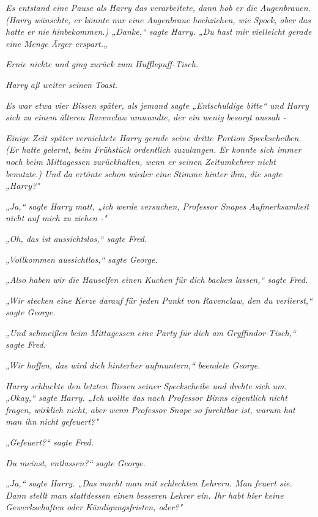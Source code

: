 {\emph{Es entstand eine Pause als Harry das verarbeitete, dann hob er die Augenbrauen. (Harry wünschte, er könnte nur eine Augenbraue hochziehen, wie Spock, aber das hatte er nie hinbekommen.) „Danke,“ sagte Harry. „Du hast mir vielleicht gerade eine Menge Ärger erspart.„}

\emph{Ernie nickte und ging zurück zum Hufflepuff-Tisch.}

\emph{Harry} \emph{aß weiter seinen} \emph{Toast.}

\emph{Es war etwa vier Bissen später, als jemand sagte „Entschuldige bitte“ und Harry sich zu einem älteren Ravenclaw} \emph{umwandte, der ein wenig besorgt aussah -}

\emph{Einige Zeit später vernichtete Harry gerade seine dritte Portion Speckscheiben. (Er hatte gelernt, beim Frühstück ordentlich zuzulangen. Er konnte sich immer noch beim Mittagessen zurückhalten, wenn er seinen Zeitumkehrer nicht benutzte.) Und da ertönte} \emph{schon wieder eine} \emph{Stimme hinter ihm, die sagte „Harry?"}

\emph{„Ja,“ sagte Harry} \emph{matt, „ich werde versuchen, Professor Snapes Aufmerksamkeit nicht auf mich zu ziehen -"}

\emph{„Oh, das ist aussichtslos,“ sagte Fred.}

\emph{„Vollkommen aussichtlos,“ sagte George.}

\emph{„Also haben wir die Hauselfen einen Kuchen für dich backen lassen,“ sagte Fred.}

\emph{„Wir stecken eine Kerze darauf für jeden Punkt} \emph{von} \emph{Ravenclaw, den du verlierst,“ sagte George.}

\emph{„Und schmeißen beim Mittagessen eine Party für dich am Gryffindor-Tisch,“ sagte Fred.}

\emph{„Wir hoffen, das wird dich hinterher aufmuntern,“ beendete George.}

\emph{Harry schluckte den letzten Bissen seiner Speckscheibe und drehte sich um. „Okay,“ sagte Harry. „Ich wollte das nach Professor Binns eigentlich nicht fragen, wirklich nicht, aber wenn Professor Snape} \emph{\emph{so}} \emph{furchtbar ist, warum} \emph{hat man ihn} \emph{nicht gefeuert?"}

\emph{„Gefeuert?“ sagte Fred.}

\emph{Du meinst, entlassen?“ sagte George.}

\emph{„Ja,“ sagte Harry. „Das macht man mit schlechten Lehrern. Man feuert sie. Dann stellt man stattdessen einen besseren Lehrer ein. Ihr habt hier keine Gewerkschaften oder Kündigungsfristen, oder?"}

}

